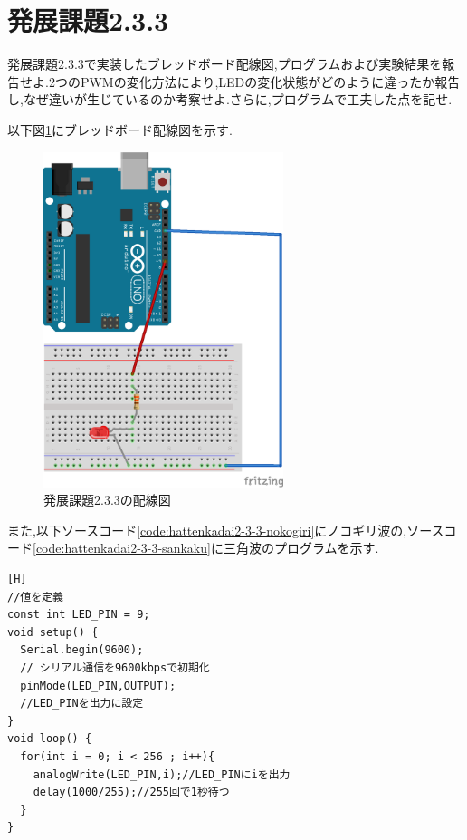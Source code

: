 \documentclass{jarticle}
\begin{document}
\section{発展課題2.3.3}

発展課題2.3.3で実装したブレッドボード配線図,プログラムおよび実験結果を報告せよ.2つのPWMの変化方法により,LEDの変化状態がどのように違ったか報告し,なぜ違いが生じているのか考察せよ.さらに,プログラムで工夫した点を記せ.

以下図\ref{fig:hattenkadai2-3-3bread}にブレッドボード配線図を示す.

\begin{figure}[H]
\begin{center}
\includegraphics[width=7.0cm]{images/hatten2-3-3_bread.png}
\caption{発展課題2.3.3の配線図}
\label{fig:hattenkadai2-3-3bread}
\end{center}
\end{figure}

また,以下ソースコード\ref{code:hattenkadai2-3-3-nokogiri}にノコギリ波の,ソースコード\ref{code:hattenkadai2-3-3-sankaku}に三角波のプログラムを示す.

\begin{lstlisting}[caption=発展課題2.3.3ノコギリ波,label=code:hattenkadai2-3-3-nokogiri][H]
//値を定義
const int LED_PIN = 9;
void setup() {
  Serial.begin(9600);
  // シリアル通信を9600kbpsで初期化
  pinMode(LED_PIN,OUTPUT);
  //LED_PINを出力に設定 
}
void loop() {
  for(int i = 0; i < 256 ; i++){
    analogWrite(LED_PIN,i);//LED_PINにiを出力
    delay(1000/255);//255回で1秒待つ
  }
}
\end{lstlisting}
\end{document}
